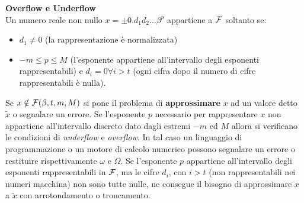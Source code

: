 \begin{defn}
    \textbf{Overflow e Underflow} \\
    Un numero reale non nullo $x = \pm 0.d_1d_2\hdots \beta^p$ appartiene a $\mathcal{F}$ soltanto se:
    
    \begin{itemize}
        \item $d_1 \neq 0$ (la rappresentazione è normalizzata)
        \item $-m \leq p \leq M$ (l'esponente appartiene all'intervallo degli esponenti rappresentabili) e $d_i = 0 \forall i > t$ (ogni cifra dopo il numero di cifre rappresentabili è nulla).
    \end{itemize}
    
    Se $x \notin \mathcal{F}(\beta, t, m, M)$ si pone il problema di \textbf{approssimare} $x$ ad un valore detto $\tilde{x}$ o segnalare un errore.
    Se l'esponente $p$ necessario per rappresentare $x$ non appartiene all'intervallo discreto dato dagli estremi $-m$ ed $M$ allora si verificano
    le condizioni di \textit{underflow} e \textit{overflow}. In tal caso un linguaggio di programmazione o un motore di calcolo numerico possono segnalare  un errore o restituire rispettivamente $\omega$ e $\Omega$. Se l'esponente $p$ appartiene all'intervallo degli esponenti rappresentabili in $\mathcal{F}$, ma le cifre $d_i$, con $i > t$ (non rappresentabili nei numeri macchina) non sono tutte nulle, ne consegue il bisogno di approssimare $x$ a $\tilde{x}$ con arrotondamento o troncamento.
\end{defn}


